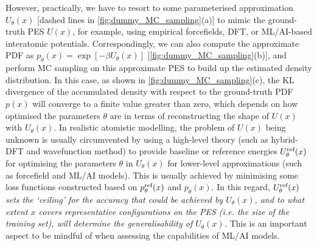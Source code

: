 However, practically, we have to resort to some parameterised approximation $U_\theta (x)$ [dashed lines in \cref{fig:dummy_MC_sampling}(a)] to mimic the ground-truth PES $U(x)$, for example, using empirical forcefields, DFT, or ML/AI-based interatomic potentials. Correspondingly, we can also compute the approximate PDF as $p_\theta (x)=\exp[-\beta U_\theta (x)]$ [\cref{fig:dummy_MC_sampling}(b)], and perform MC sampling on this approximate PES to build up the estimated density distribution. In this case, as shown in \cref{fig:dummy_MC_sampling}(c), the KL divergence of the accumulated density with respect to the ground-truth PDF $p(x)$ will converge to a finite value greater than zero, which depends on how optimised the parameters $\theta$ are in terms of reconstructing the shape of $U(x)$ with $U_\theta (x)$. In realistic atomistic modelling, the problem of $U(x)$ being unknown is usually circumvented by using a high-level theory (such as hybrid-DFT and wavefunction method) to provide baseline or reference energies $U_{\theta}^{\mbox{\scriptsize{ref}}}(x)$ for optimising the parameters $\theta$ in $U_\theta (x)$ for lower-level approximations (such as forcefield and ML/AI models).  This is usually achieved by minimising some loss functions constructed based on $p_{\theta}^{\mbox{\scriptsize{ref}}}(x)$ and $p_\theta(x)$. In this regard, \textit{$U_{\theta}^{\mbox{\scriptsize{ref}}}(x)$ sets the `ceiling' for the accuracy that could be achieved by $U_\theta(x)$, and to what extent $x$ covers representative configurations on the PES (i.e. the size of the training set), will determine the generalisability of $U_\theta(x)$.} This is an important aspect to be mindful of when assessing the capabilities of ML/AI models.

